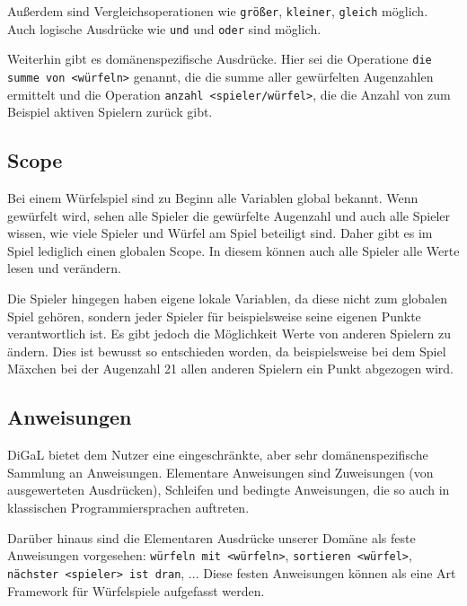	Außerdem sind Vergleichsoperationen wie \texttt{größer}, \texttt{kleiner}, \texttt{gleich} möglich. Auch logische Ausdrücke wie \texttt{und} und \texttt{oder} sind möglich.
	
	Weiterhin gibt es domänenspezifische Ausdrücke. Hier sei die Operatione \texttt{die summe von <würfeln>} genannt, die die summe aller gewürfelten Augenzahlen ermittelt und die Operation \texttt{anzahl <spieler/würfel>}, die die Anzahl von zum Beispiel aktiven Spielern zurück gibt.


\subsection{Scope} %
\label{sub:scope}
	Bei einem Würfelspiel sind zu Beginn alle Variablen global bekannt. Wenn gewürfelt wird, sehen alle Spieler die gewürfelte Augenzahl und auch alle Spieler wissen, wie viele Spieler und Würfel am Spiel beteiligt sind. Daher gibt es im Spiel lediglich einen globalen Scope. In diesem können auch alle Spieler alle Werte lesen und verändern.
	
	Die Spieler hingegen haben eigene lokale Variablen, da diese nicht zum globalen Spiel gehören, sondern jeder Spieler für beispielsweise seine eigenen Punkte verantwortlich ist. Es gibt jedoch die Möglichkeit Werte von anderen Spielern zu ändern. Dies ist bewusst so entschieden worden, da beispielsweise bei dem Spiel Mäxchen bei der Augenzahl 21 allen anderen Spielern ein Punkt abgezogen wird.


\subsection{Anweisungen} %
\label{sub:anweisungen}
DiGaL bietet dem Nutzer eine eingeschränkte, aber sehr domänenspezifische Sammlung an Anweisungen. Elementare Anweisungen sind Zuweisungen (von ausgewerteten Ausdrücken), Schleifen und bedingte Anweisungen, die so auch in klassischen Programmiersprachen auftreten.

Darüber hinaus sind die Elementaren Ausdrücke unserer Domäne als feste Anweisungen vorgesehen: \texttt{würfeln mit <würfeln>}, \texttt{sortieren <würfel>}, \texttt{nächster <spieler> ist dran}, ... Diese festen Anweisungen können als eine Art Framework für Würfelspiele aufgefasst werden.







